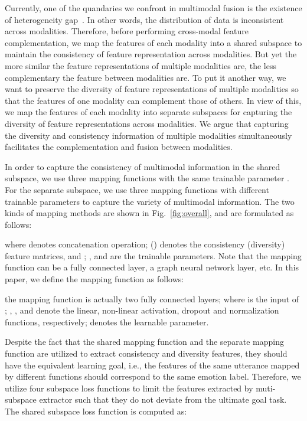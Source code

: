\documentclass[lettersize,journal]{IEEEtran}
\begin{document}
Currently, one of the quandaries we confront in multimodal fusion is the existence of heterogeneity gap~\cite{guo2019dmrl}. In other words, the distribution of data is inconsistent across modalities. Therefore, before performing cross-modal feature complementation, we map the features of each modality into a shared subspace to maintain the consistency of feature representation across modalities. But yet the more similar the feature representations of multiple modalities are, the less complementary the feature between modalities are. To put it another way, we want to preserve the diversity of feature representations of multiple modalities so that the features of one modality can complement those of others. In view of this, we map the features of each modality into separate subspaces for capturing the diversity of feature representations across modalities. We argue that capturing the diversity and consistency information of multiple modalities simultaneously facilitates the complementation and fusion between modalities.

In order to capture the consistency of multimodal information in the shared subspace, we use three mapping functions  with the same trainable parameter . For the separate subspace, we use three mapping functions  with different trainable parameters  to capture the variety of multimodal information. The two kinds of mapping methods are shown in Fig.~\ref{fig:overall}, and are formulated as follows:

where  denotes concatenation operation;  () denotes the consistency (diversity) feature matrices, and ; ,  and  are the trainable parameters. Note that the mapping function  can be a fully connected layer, a graph neural network layer, etc. In this paper, we define the mapping function  as follows:

the mapping function  is actually two fully connected layers; where  is the input of ; , ,  and  denote the linear, non-linear activation, dropout and normalization functions, respectively;  denotes the learnable parameter. 

Despite the fact that the shared mapping function  and the separate mapping function  are utilized to extract consistency and diversity features, they should have the equivalent learning goal, i.e., the features of the same utterance mapped by different functions should correspond to the same emotion label. Therefore, we utilize four subspace loss functions to limit the features extracted by muti-subspace extractor such that they do not deviate from the ultimate goal task. The shared subspace loss function is computed as:
\end{document}
